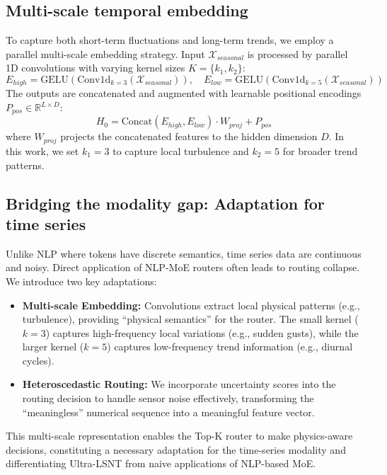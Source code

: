 \documentclass[review,3p,times,draft]{elsarticle}
\begin{document}
\subsection{Multi-scale temporal embedding}
To capture both short-term fluctuations and long-term trends, we employ a parallel multi-scale embedding strategy. Input $\mathcal{X}_{seasonal}$ is processed by parallel 1D convolutions with varying kernel sizes $K=\{k_1, k_2\}$:
\begin{equation}
    E_{high} = \text{GELU}(\text{Conv1d}_{k=3}(\mathcal{X}_{seasonal})), \quad E_{low} = \text{GELU}(\text{Conv1d}_{k=5}(\mathcal{X}_{seasonal}))
\end{equation}
The outputs are concatenated and augmented with learnable positional encodings $P_{pos} \in \mathbb{R}^{L \times D}$:
\begin{equation}
    H_{0} = \text{Concat}(E_{high}, E_{low}) \cdot W_{proj} + P_{pos}
\end{equation}
where $W_{proj}$ projects the concatenated features to the hidden dimension $D$. In this work, we set $k_1=3$ to capture local turbulence and $k_2=5$ for broader trend patterns.

\subsection{Bridging the modality gap: Adaptation for time series}
Unlike NLP where tokens have discrete semantics, time series data are continuous and noisy. Direct application of NLP-MoE routers often leads to routing collapse. We introduce two key adaptations:

\begin{itemize}
    \item \textbf{Multi-scale Embedding:} Convolutions extract local physical patterns (e.g., turbulence), providing ``physical semantics'' for the router. The small kernel ($k=3$) captures high-frequency local variations (e.g., sudden gusts), while the larger kernel ($k=5$) captures low-frequency trend information (e.g., diurnal cycles).
    
    \item \textbf{Heteroscedastic Routing:} We incorporate uncertainty scores into the routing decision to handle sensor noise effectively, transforming the ``meaningless'' numerical sequence into a meaningful feature vector.
\end{itemize}

This multi-scale representation enables the Top-K router to make physics-aware decisions, constituting a necessary adaptation for the time-series modality and differentiating Ultra-LSNT from naive applications of NLP-based MoE.
\end{document}
